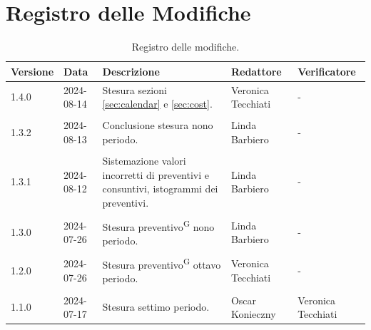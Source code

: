 \documentclass[8pt]{article}
\newcommand{\glossterm}[1]{#1\textsuperscript{G}} %
\begin{document}
\section*{Registro delle Modifiche}
\begin{table}[ht!]	
\hypersetup{hidelinks}
	\centering
	\begin{tabular}{p{1.2cm} p{2cm} p{5cm} p{3cm} p{3cm}}
		\toprule
		\textbf{Versione}& \textbf{Data} & \textbf{Descrizione} & \textbf{Redattore} & \textbf{Verificatore} \\
		\midrule
            1.4.0 & 2024-08-14 & Stesura sezioni \ref{sec:calendar} e \ref{sec:cost}. & Veronica Tecchiati & - \\\\
            1.3.2 & 2024-08-13 & Conclusione stesura nono periodo. & Linda Barbiero & - \\\\
            1.3.1 & 2024-08-12 & Sistemazione valori incorretti di preventivi e consuntivi, istogrammi dei preventivi. & Linda Barbiero & - \\\\
            1.3.0 & 2024-07-26 & Stesura \glossterm{preventivo} nono periodo. & Linda Barbiero & -
 		    \\\\
            1.2.0 & 2024-07-26 & Stesura \glossterm{preventivo} ottavo periodo. & Veronica Tecchiati & -
 		    \\\\
			1.1.0 & 2024-07-17 & Stesura settimo periodo. & Oscar Konieczny & Veronica Tecchiati
 		    \\ %
		\bottomrule
	\end{tabular}
	\caption{Registro delle modifiche.}
	\label{table:Registro delle modifiche}
\end{table}
\clearpage
\end{document}

